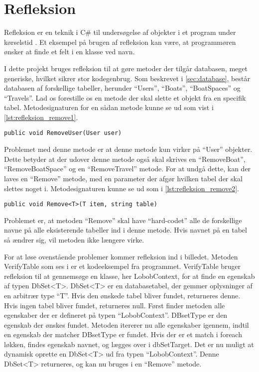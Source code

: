 \section{Refleksion}
\label{sec:refleksion}


Refleksion er en teknik i C\# til undersøgelse af objekter i et program under kørselstid \cite{michaelis2012essential}. Et eksempel på brugen af refleksion kan være, at programmøren ønsker at finde et felt i en klasse ved navn.

I dette projekt bruges refleksion til at gøre metoder der tilgår databasen, meget generiske, hvilket sikrer stor kodegenbrug. Som beskrevet i \cref{sec:database}, består databasen af forskellige tabeller, herunder \enquote{Users}, \enquote{Boats}, \enquote{BoatSpaces} og \enquote{Travels}. Lad os forestille os en metode der skal slette et objekt fra en specifik tabel. Metodesignaturen for en sådan metode kunne se ud som vist i \cref{lst:refleksion_remove1}.


\begin{lstlisting}[label=lst:refleksion_remove1]
public void RemoveUser(User user)
\end{lstlisting}

Problemet med denne metode er at denne metode kun virker på \enquote{User} objekter. Dette betyder at der udover denne metode også skal skrives en \enquote{RemoveBoat}, \enquote{RemoveBoatSpace} og en \enquote{RemoveTravel} metode. For at undgå dette, kan der laves en \enquote{Remove} metode, med en parameter der afgør hvilken tabel der skal slettes noget i. Metodesignaturen kunne se ud som i \cref{lst:refleksion_remove2}.


\begin{lstlisting}[label=lst:refleksion_remove2]
public void Remove<T>(T item, string table)
\end{lstlisting}

Problemet er, at metoden \enquote{Remove} skal have \enquote{hard-codet} alle de forskellige navne på alle eksisterende tabeller ind i denne metode. Hvis navnet på en tabel så ændrer sig, vil metoden ikke længere virke.

For at løse ovenstående problemer kommer refleksion ind i billedet. Metoden VerifyTable som ses i  er et kodeeksempel fra programmet. VerifyTable bruger refleksion til at gennemsøge en klasse, her LobobContext, for at finde en egenskab af typen DbSet<T>. DbSet<T> er en databasetabel, der gemmer oplysninger af en arbitrær type \enquote{T}. Hvis den ønskede tabel bliver fundet, returneres denne. Hvis ingen tabel bliver fundet, returneres null. Først finder metoden alle egenskaber der er defineret på typen \enquote{LobobContext}. DBsetType er den egenskab der ønskes fundet. Metoden itererer nu alle egenskaber igennem, indtil en egenskab der matcher DBsetType er fundet. Hvis der er et match i foreach løkken, findes egenskab navnet, og lægges over i dbSetTarget. Det er nu muligt at dynamisk oprette en DbSet<T> ud fra typen \enquote{LobobContext}. Denne DbSet<T> returneres, og kan nu bruges i en \enquote{Remove} metode.

